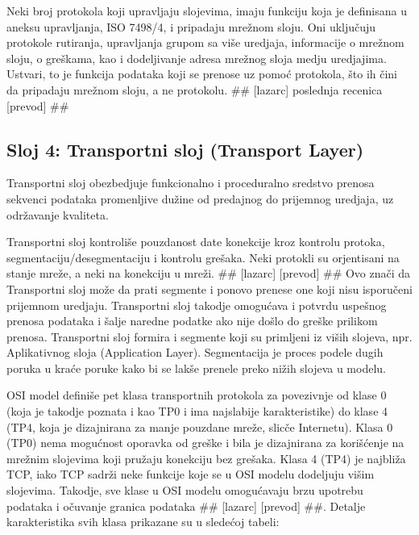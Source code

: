 \documentclass[a4paper,12pt, master]{etf}
\begin{document}
	Neki broj protokola koji upravljaju slojevima, imaju funkciju koja je
	definisana u aneksu	upravljanja, ISO 7498/4, i pripadaju mre\v{z}nom sloju.
	Oni uklju\v{c}uju protokole rutiranja, upravljanja grupom sa vi\v{s}e
	uredjaja, informacije o mre\v{z}nom sloju, o gre\v{s}kama, kao i
	dodeljivanje adresa mre\v{z}nog sloja medju uredjajima. Ustvari, to je
	funkcija podataka koji se prenose uz pomo\'{c} protokola, \v{s}to ih
	\v{c}ini da pripadaju mre\v{z}nom sloju, a ne protokolu.
	\#\# [lazarc] poslednja	recenica [prevod] \#\#

	\subsection{Sloj 4: Transportni sloj (Transport Layer)}

	Transportni sloj obezbedjuje funkcionalno i proceduralno sredstvo prenosa
	sekvenci podataka promenljive du\v{z}ine od predajnog do prijemnog uredjaja,
	 uz odr\v{z}avanje kvaliteta.

	Transportni sloj kontroli\v{s}e pouzdanost date konekcije kroz kontrolu
	protoka, segmentaciju/desegmentaciju i kontrolu gre\v{s}aka. Neki protokli
	su orjentisani na stanje mre\v{z}e, a neki na konekciju u mre\v{z}i.
	\#\# [lazarc] [prevod] \#\# Ovo zna\v{c}i da Transportni sloj mo\v{z}e da
	prati segmente i ponovo prenese one koji nisu isporu\v{c}eni prijemnom
	uredjaju. Transportni sloj takodje omogu\'{c}ava i potvrdu uspe\v{s}nog
	prenosa podataka i \v{s}alje naredne podatke ako nije do\v{s}lo do
	gre\v{s}ke prilikom prenosa. Transportni sloj formira i segmente koji su
	primljeni iz vi\v{s}ih slojeva, npr. Aplikativnog sloja (Application Layer).
	Segmentacija je proces podele dugih poruka u kra\'{c}e poruke kako bi se
	lak\v{s}e prenele preko	ni\v{z}ih slojeva u modelu.

	OSI model defini\v{s}e pet klasa transportnih protokola za povezivnje od
	klase 0 (koja je takodje poznata i kao TP0 i ima najslabije karakteristike)
	do klase 4 (TP4, koja je dizajnirana za manje pouzdane mre\v{z}e,
	slic\v{c}e Internetu). Klasa 0 (TP0) nema mogu\'{c}nost	oporavka od
	gre\v{s}ke i bila je dizajnirana za kori\v{s}\'{c}enje na mre\v{z}nim
	slojevima koji pru\v{z}aju konekciju bez gre\v{s}aka. Klasa 4 (TP4) je
	najbli\v{z}a TCP, iako TCP sadr\v{z}i neke funkcije koje se u OSI modelu
	dodeljuju vi\v{s}im slojevima. Takodje, sve klase u OSI modelu
	omogu\'{c}avaju	brzu upotrebu podataka i o\v{c}uvanje granica podataka
	\#\# [lazarc] [prevod] \#\#. Detalje karakteristika svih klasa prikazane su
	u slede\'{c}oj tabeli:
\end{document}
